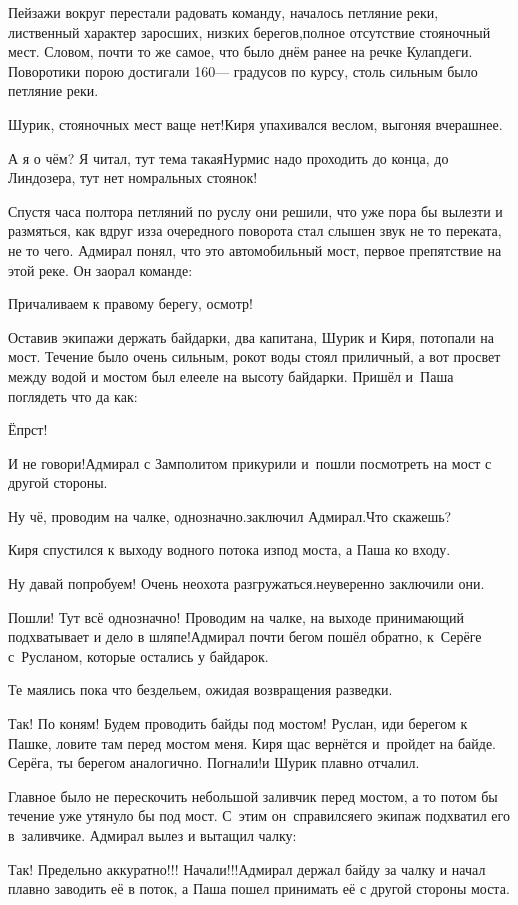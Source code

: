 Пейзажи вокруг перестали радовать команду, началось петляние реки, лиственный характер заросших, низких берегов,полное отсутствие стояночный мест. Словом, почти то же самое, что было днём ранее на речке Кулапдеги. Поворотики порою достигали 160\thinspace\nobreakdash--- градусов по курсу, столь сильным было петляние реки.

\diagdash Шурик, стояночных мест ваще нет!\mdash Киря упахивался веслом, выгоняя вчерашнее.

\diagdash А я о чём? Я читал, тут тема такая\mdash Нурмис надо проходить до конца, до Линдозера, тут нет номральных стоянок!

Спустя часа полтора петляний по руслу они решили, что уже пора бы вылезти и размяться, как вдруг из\sdash за очередного поворота стал слышен звук не то переката, не то чего. Адмирал понял, что это автомобильный мост, первое препятствие на этой реке. Он заорал команде:

\diagdash Причаливаем к правому берегу, осмотр!

Оставив экипажи держать байдарки, два капитана, Шурик и Киря, потопали на мост. Течение было очень сильным, рокот воды стоял приличный, а вот просвет между водой и мостом был еле\sdash еле на высоту байдарки. Пришёл и~Паша поглядеть что да как:

\diagdash Ёпрст!

\diagdash И не говори!\mdash Адмирал с Замполитом прикурили и~пошли посмотреть на мост с другой стороны.

\diagdash Ну чё, проводим на чалке, однозначно.\mdash заключил Адмирал.\mdash Что скажешь?

Киря спустился к выходу водного потока из\sdash под моста, а Паша ко входу.

\diagdash Ну давай попробуем! Очень неохота разгружаться.\mdash неуверенно заключили они.

\diagdash Пошли! Тут всё однозначно! Проводим на чалке, на выходе принимающий подхватывает и дело в шляпе!\mdash Адмирал почти бегом пошёл обратно, к~Серёге с~Русланом, которые остались у байдарок.

Те маялись пока что бездельем, ожидая возвращения разведки.

\diagdash Так! По коням! Будем проводить байды под мостом! Руслан, иди берегом к Пашке, ловите там перед мостом меня. Киря щас вернётся и~пройдет на байде. Серёга, ты берегом аналогично. Погнали!\mdash и Шурик плавно отчалил. 

Главное было не перескочить небольшой заливчик перед мостом, а то потом бы течение уже утянуло бы под мост. С~этим он~справился\mdash его экипаж подхватил его в~заливчике. Адмирал вылез и вытащил чалку:

\diagdash Так! Предельно аккуратно!!! Начали!!!\mdash Адмирал держал байду за чалку и начал плавно заводить её в поток, а Паша пошел принимать её с другой стороны моста.

 





\begin{center}
\end{center}
